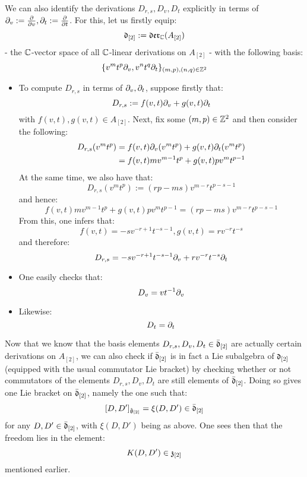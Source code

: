 \begin{remark}
                We can also identify the derivations $D_{r, s}, D_v, D_t$ explicitly in terms of $\partial_v := \frac{\partial}{\partial v}, \partial_t := \frac{\partial}{\partial t}$. For this, let us firstly equip:
                    $$\mathfrak{d}_{[2]} := \mathfrak{der}_{\mathbb{C}}(A_{[2]})$$
                - the $\mathbb{C}$-vector space of all $\mathbb{C}$-linear derivations on $A_{[2]}$ - with the following basis:
                    $$\{ v^m t^p \partial_v, v^n t^q \partial_t \}_{(m, p), (n, q) \in \mathbb{Z}^2}$$
                \begin{itemize}
                    \item To compute $D_{r, s}$ in terms of $\partial_v, \partial_t$, suppose firstly that:
                        $$D_{r, s} := f(v, t) \partial_v + g(v, t) \partial_t$$
                    with $f(v, t), g(v, t) \in A_{[2]}$. Next, fix some $(m, p) \in \mathbb{Z}^2$ and then consider the following:
                        $$
                            \begin{aligned}
                                D_{r, s}( v^m t^p ) & = f(v, t) \partial_v( v^m t^p ) + g(v, t) \partial_t( v^m t^p )
                                \\
                                & = f(v, t) m v^{m - 1} t^p + g(v, t) p v^m t^{p - 1}
                            \end{aligned}
                        $$
                    At the same time, we also have that:
                        $$D_{r, s}(v^m t^p) := ( rp - ms ) v^{m - r} t^{p - s - 1}$$
                    and hence:
                        $$f(v, t) m v^{m - 1} t^p + g(v, t) p v^m t^{p - 1} = ( rp - ms ) v^{m - r} t^{p - s - 1}$$
                    From this, one infers that:
                        $$f(v, t) = -s v^{-r + 1} t^{-s - 1}, g(v, t) = r v^{-r} t^{-s}$$
                    and therefore:
                        $$D_{r, s} = -s v^{-r + 1} t^{-s - 1} \partial_v + r v^{-r} t^{-s} \partial_t$$
                    \item One easily checks that:
                        $$D_v = v t^{-1} \partial_v$$
                    \item Likewise:
                        $$D_t = \partial_t$$
                \end{itemize}

                Now that we know that the basis elements $D_{r, s}, D_v, D_t \in \bar{\mathfrak{d}}_{[2]}$ are actually certain derivations on $A_{[2]}$, we can also check if $\bar{\mathfrak{d}}_{[2]}$ is in fact a Lie subalgebra of $\mathfrak{d}_{[2]}$ (equipped with the usual commutator Lie bracket) by checking whether or not commutators of the elements $D_{r, s}, D_v, D_t$ are still elements of $\bar{\mathfrak{d}}_{[2]}$. Doing so gives one Lie bracket on $\bar{\mathfrak{d}}_{[2]}$, namely the one such that:
                    $$[D, D']_{\hat{\mathfrak{g}}_{[2]}} = \xi(D, D') \in \bar{\mathfrak{d}}_{[2]}$$
                for any $D, D' \in \bar{\mathfrak{d}}_{[2]}$, with $\xi(D, D')$ being as above. One sees then that the freedom lies in the element:
                    $$K(D, D') \in \mathfrak{z}_{[2]}$$
                mentioned earlier. 
            \end{remark}
